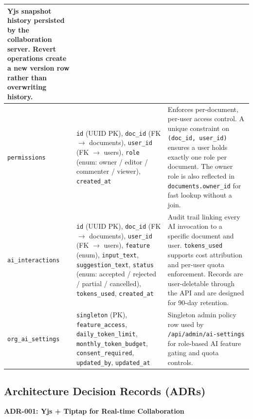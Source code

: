\documentclass{article}
\begin{document}
{\begin{tabularx}{\textwidth}{|>{\hsize=0.5\hsize\raggedright\arraybackslash}X|>{\hsize=1\hsize\raggedright\arraybackslash}X|>{\hsize=1.5\hsize\raggedright\arraybackslash}X|}
Yjs snapshot history persisted by the collaboration server. Revert operations create a new version row rather than overwriting history. \\
\hline
\texttt{permissions} &
\texttt{id} (UUID PK), \texttt{doc\_id} (FK $\rightarrow$ documents), \texttt{user\_id} (FK $\rightarrow$ users), \texttt{role} (enum: owner / editor / commenter / viewer), \texttt{created\_at} &
Enforces per-document, per-user access control. A unique constraint on \texttt{(doc\_id, user\_id)} ensures a user holds exactly one role per document. The owner role is also reflected in \texttt{documents.owner\_id} for fast lookup without a join. \\
\hline
\texttt{ai\_interactions} &
\texttt{id} (UUID PK), \texttt{doc\_id} (FK $\rightarrow$ documents), \texttt{user\_id} (FK $\rightarrow$ users), \texttt{feature} (enum), \texttt{input\_text}, \texttt{suggestion\_text}, \texttt{status} (enum: accepted / rejected / partial / cancelled), \texttt{tokens\_used}, \texttt{created\_at} &
Audit trail linking every AI invocation to a specific document and user. \texttt{tokens\_used} supports cost attribution and per-user quota enforcement. Records are user-deletable through the API and are designed for 90-day retention. \\
\hline
\texttt{org\_ai\_settings} &
\texttt{singleton} (PK), \texttt{feature\_access}, \texttt{daily\_token\_limit}, \texttt{monthly\_token\_budget}, \texttt{consent\_required}, \texttt{updated\_by}, \texttt{updated\_at} &
Singleton admin policy row used by \texttt{/api/admin/ai-settings} for role-based AI feature gating and quota controls. \\
\hline
\end{tabularx}
}































\subsection{Architecture Decision Records (ADRs)}
\vspace{5pt}
\noindent\textbf{ADR-001: Yjs + Tiptap for Real-time Collaboration}
\end{document}
